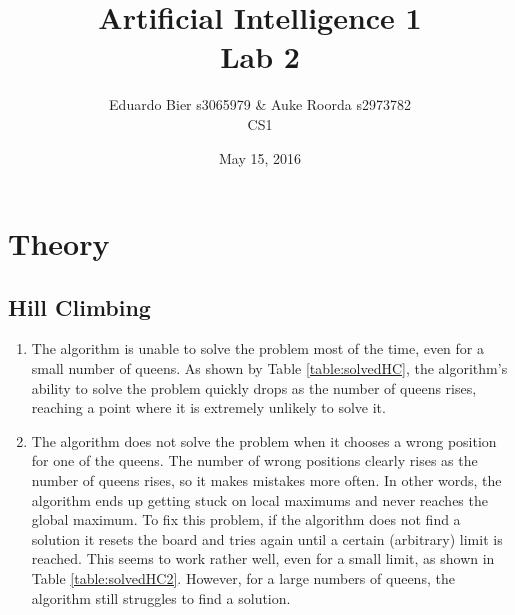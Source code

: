 \documentclass{article}
\title{Artificial Intelligence 1 \\ Lab 2}%
\author{Eduardo Bier s3065979 \& Auke Roorda s2973782 \\ CS1} %
\date{May 15, 2016}%
\begin{document}
\maketitle

\section*{Theory}
\subsection*{Hill Climbing}

\begin{enumerate}
\item The algorithm is unable to solve the problem most of the time, even for a small number of queens. As shown by Table \ref{table:solvedHC}, the algorithm's ability to solve the problem quickly drops as the number of queens rises, reaching a point where it is extremely unlikely to solve it. 

\begin{table}[ht]
\end{table}

\item The algorithm does not solve the problem when it chooses a wrong position for one of the queens. The number of wrong positions clearly rises as the number of queens rises, so it makes mistakes more often. In other words, the algorithm ends up getting stuck on local maximums and never reaches the global maximum. To fix this problem, if the algorithm does not find a solution it resets the board and tries again until a certain (arbitrary) limit is reached. This seems to work rather well, even for a small limit, as shown in Table \ref{table:solvedHC2}. However, for a large numbers of queens, the algorithm still struggles to find a solution.


\end{enumerate}
\end{document}
